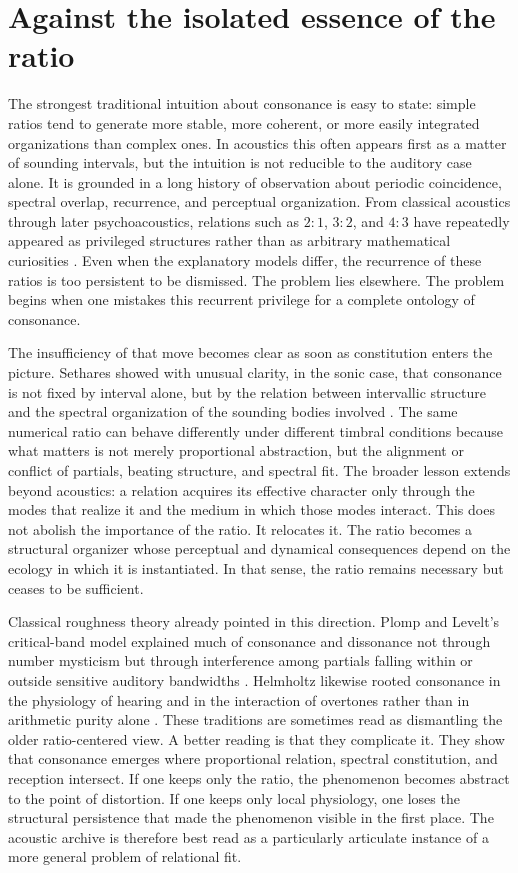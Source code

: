 \section{Against the isolated essence of the ratio}


The strongest traditional intuition about consonance is easy to state: simple ratios tend to generate more stable, more coherent, or more easily integrated organizations than complex ones. In acoustics this often appears first as a matter of sounding intervals, but the intuition is not reducible to the auditory case alone. It is grounded in a long history of observation about periodic coincidence, spectral overlap, recurrence, and perceptual organization. From classical acoustics through later psychoacoustics, relations such as $2{:}1$, $3{:}2$, and $4{:}3$ have repeatedly appeared as privileged structures rather than as arbitrary mathematical curiosities \parencite{helmholtz_1863,plomp_1965}. Even when the explanatory models differ, the recurrence of these ratios is too persistent to be dismissed. The problem lies elsewhere. The problem begins when one mistakes this recurrent privilege for a complete ontology of consonance.

The insufficiency of that move becomes clear as soon as constitution enters the picture. Sethares showed with unusual clarity, in the sonic case, that consonance is not fixed by interval alone, but by the relation between intervallic structure and the spectral organization of the sounding bodies involved \parencite{sethares_2005}. The same numerical ratio can behave differently under different timbral conditions because what matters is not merely proportional abstraction, but the alignment or conflict of partials, beating structure, and spectral fit. The broader lesson extends beyond acoustics: a relation acquires its effective character only through the modes that realize it and the medium in which those modes interact. This does not abolish the importance of the ratio. It relocates it. The ratio becomes a structural organizer whose perceptual and dynamical consequences depend on the ecology in which it is instantiated. In that sense, the ratio remains necessary but ceases to be sufficient.

Classical roughness theory already pointed in this direction. Plomp and Levelt's critical-band model explained much of consonance and dissonance not through number mysticism but through interference among partials falling within or outside sensitive auditory bandwidths \parencite{plomp_1965}. Helmholtz likewise rooted consonance in the physiology of hearing and in the interaction of overtones rather than in arithmetic purity alone \parencite{helmholtz_1863}. These traditions are sometimes read as dismantling the older ratio-centered view. A better reading is that they complicate it. They show that consonance emerges where proportional relation, spectral constitution, and reception intersect. If one keeps only the ratio, the phenomenon becomes abstract to the point of distortion. If one keeps only local physiology, one loses the structural persistence that made the phenomenon visible in the first place. The acoustic archive is therefore best read as a particularly articulate instance of a more general problem of relational fit.

